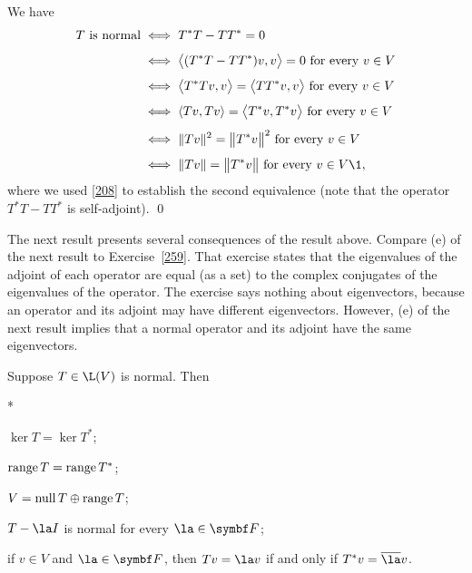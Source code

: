 \proof
We have
\begin{align*}
T \text{\ is normal}  &\iff T^*T - TT^* = 0 \\[4bp]
&\iff \ip[\big]{(T^*T - TT^*)v, v} = 0 \text{ for every } v \in V\\[4bp]
&\iff \ip[\big]{T^*T v, v} = \ip[\big]{TT^* v, v} \text{ for every } v \in V\\[4bp]
&\iff \ip{T v, Tv} = \ip[\big]{T^* v, T^*v} \text{ for every } v \in V\\[4bp]
&\iff \|Tv\|^2 = \norm[\big]{T^*v}^2 \text{ for every } v\in V \\[4bp]
&\iff \|Tv\| = \norm[\big]{T^*v} \text{ for every } v\in V\1,
\end{align*}
where we used \ref{208} to establish the second equivalence (note that the
operator $T^*T - TT^*$ is self-adjoint).
\qed

The next result presents several consequences of the result above. Compare (e) of the next result to  Exercise~\ref{259}.  That
exercise states that the eigenvalues of the adjoint of each operator are equal (as
a set) to the complex conjugates of the eigenvalues of the operator.  The
exercise says nothing about eigenvectors, because an operator and its adjoint
may have different eigenvectors.  However, (e) of the next result implies that a
normal operator and its adjoint have the same eigenvectors.

{Suppose $T \in \L(V)$ is normal. Then
\begin{subtheorem}*
\item
$\ker T = \ker T^*$;
\item
$\operatorname{range} T = \operatorname{range} T^*$;
\item
$V = \operatorname{null} T \oplus \operatorname{range} T$;
\item
$T - \la I$ is normal for every $\la \in \F{}$;
\item
if $v \in V$ and $\la \in \F{}$, then $Tv = \la v$ if and only if $T^*v = \bar{\la} v$.
\end{subtheorem}}

